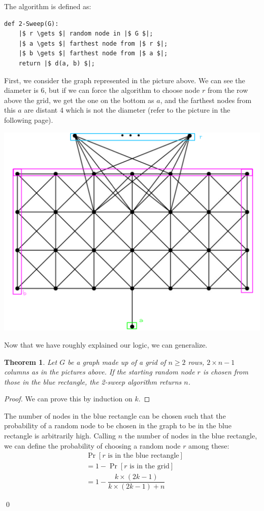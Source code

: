 \documentclass{article}
\newtheorem*{theorem}{Theorem}
\begin{document}
The algorithm is defined as:
\begin{verbatim}
def 2-Sweep(G):
	|$ r \gets $| random node in |$ G $|;
	|$ a \gets $| farthest node from |$ r $|;
	|$ b \gets $| farthest node from |$ a $|;
	return |$ d(a, b) $|;
\end{verbatim}

First, we consider the graph represented in the picture above.
We can see the diameter is 6, but if we can force the algorithm to choose node \(r\) from the row
above the grid, we get the one on the bottom as \(a\), and the farthest nodes from this \(a\)
are distant 4 which is not the diameter (refer to the picture in the following page).

\pagebreak
\includegraphics*[scale=0.06]{./images/annotated-graph.png}

Now that we have roughly explained our logic, we can generalize.

\begin{theorem}
	Let \(G\) be a graph made up of a grid of \(n \geq 2\) rows, \(2\times n - 1\) columns as in the pictures
	above. If the starting random node \(r\) is chosen from those in the blue rectangle,
	the 2-sweep algorithm returns \(n\).
\end{theorem}

\begin{proof}
	We can prove this by induction on \(k\).
\end{proof}

The number of nodes in the blue rectangle can be chosen such that the probability
of a random node to be chosen in the graph to be in the blue rectangle is arbitrarily high.
Calling \(n\) the number of nodes in the blue rectangle, we can define the probability of choosing
a random node \(r\) among these:
\[
	\begin{aligned}
		& \Pr\left[\text{\(r\) is in the blue rectangle}\right] \\
		&= 1 - \Pr\left[\text{\(r\) is in the grid}\right] \\
		&= 1 - \dfrac{k \times \left(2k - 1\right)}{k \times \left(2k - 1\right) + n}
	\end{aligned}
\]

\qed
\end{document}
